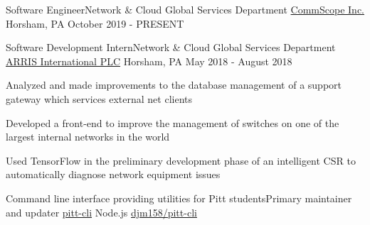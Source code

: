 \vspace{-1mm}

\vspace{-1mm}
\begin{cventries}

  \cventrywork
    {Software Engineer{\enskip\cdotp\enskip}Network \& Cloud Global Services Department} %
    {\href{https://www.commscope.com/}{CommScope Inc.}} %
    {Horsham, PA} %
    {October 2019 - PRESENT} %

  \vspace{1mm}

  \cventry
    {Software Development Intern{\enskip\cdotp\enskip}Network \& Cloud Global Services Department} %
    {\href{https://www.arris.com/}{ARRIS International PLC}} %
    {Horsham, PA} %
    {May 2018 - August 2018} %
    {
      \begin{cvitems} %
        \item {Analyzed and made improvements to the database management of a support gateway which services external net clients}
        \item {Developed a front-end to improve the management of switches on one of the largest internal networks in the world}
        \item {Used TensorFlow in the preliminary development phase of an intelligent CSR to automatically diagnose network equipment issues}
      \end{cvitems}
    }

  \vspace{1mm}

  \cventrywork
    {Command line interface providing utilities for Pitt students{\enskip\cdotp\enskip}Primary maintainer and updater} %
    {\href{https://www.npmjs.com/package/pitt-cli}{\faCodeFork \hspace{0.5mm}pitt-cli}} %
    {Node.js} %
    {\href{https://github.com/djm158/pitt-cli}{\faGithub \hspace{0.5mm} djm158/pitt-cli}} %

  \vspace{-5mm}

\end{cventries}
